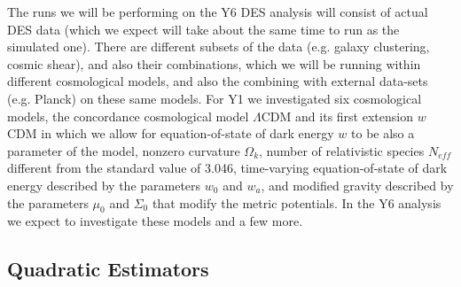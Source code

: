 \documentclass[12pt]{article}
\begin{document}
\begin{small}
The runs we will be performing on the Y6 DES analysis will consist of actual DES data (which we expect will take about the same time to run as the simulated one). There are different subsets of the data (e.g. galaxy clustering, cosmic shear), and also their combinations, which we will be running within different cosmological models, and also the combining with external data-sets (e.g. Planck) on these same models. For Y1 we investigated six cosmological models, the concordance cosmological model $\Lambda$CDM and its first extension $w$CDM in which we allow for equation-of-state of dark energy $w$ to be also a parameter of the model, nonzero curvature $\Omega_k$,  number of relativistic species $N_{eff}$ different from the standard value of 3.046, time-varying equation-of-state of dark energy described by the parameters $w_0$ and $w_a$, and modified gravity described by the parameters $\mu_0$ and $\Sigma_0$ that modify the metric potentials. In the Y6 analysis we expect to investigate these models and a few more.



\subsection{Quadratic Estimators}

\end{small}
\end{document}

